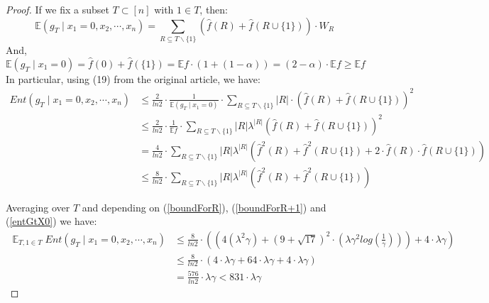 \documentclass{article}
\begin{document}
\begin{proof}
				If we fix a subset $T \subset [n]$ with $1 \in T$, then:
				\begin{equation} \label{g_T with x1=0}
					\mathbb{E} \left( g_T \mid x_1 = 0,x_2, \cdots, x_n \right) = \sum_{R \subseteq T \backslash \{1\}} \left( \hat{f}(R) + \hat{f}(R \cup \{1\}) \right) \cdot W_R
				\end{equation}
				And,
				\begin{equation}
					\mathbb{E} \left( g_T \mid x_1=0 \right) = \hat{f}(0) + \hat{f}(\{1\}) = \mathbb{E} f \cdot \left( 1 + (1-\alpha) \right) = (2-\alpha) \cdot \mathbb{E} f \geq \mathbb{E} f 
				\end{equation}
				In particular, using (19) from the original article, we have:				
				\begin{equation} \label{entGtX0} \begin{aligned}
					Ent \left( g_T \mid x_1 = 0,x_2, \cdots, x_n \right) 
					& \leq \frac{2}{ln 2} \cdot \frac{1}{\mathbb{E} \left( g_T \mid x_1=0 \right)} \cdot \sum_{R \subseteq {T\backslash \{1\}}} |R| \cdot \left( \hat{f} (R) + \hat{f} (R \cup \{1\}) \right)^2 \\ 
					& \leq \frac{2}{ln 2} \cdot \frac{1}{\mathbb{E} f} \cdot \sum_{R \subseteq {T\backslash \{1\}}} |R| \lambda^{|R|} \left( \hat{f} (R) + \hat{f} (R \cup \{1\}) \right)^2 \\ 
					& = \frac{4}{ln 2} \cdot \sum_{R \subseteq {T\backslash \{1\}}} |R| \lambda^{|R|} \left( \hat{f}^2 (R) + \hat{f}^2 (R \cup \{1\}) + 2 \cdot \hat{f}(R)  \cdot \hat{f} (R \cup \{1\}) \right) \\ 
					& \leq \frac{8}{ln 2} \cdot \sum_{R \subseteq {T\backslash \{1\}}} |R| \lambda^{|R|}  \left( \hat{f}^2 (R) + \hat{f}^2 (R \cup \{1\}) \right)
				\end{aligned}
				\end{equation}
				
				Averaging over $T$ and depending on (\ref{boundForR}), (\ref{boundForR+1}) and (\ref{entGtX0}) we have:
				\begin{equation} \label{final22} \begin{aligned}
					\mathop{\mathbb{E}}_{T, 1 \in T} Ent \left( g_T \mid x_1 = 0,x_2, \cdots, x_n \right)
					& \leq \frac{8}{ln 2} \cdot \left( \left( 4 ( \lambda^2 \gamma ) + \left( 9 + \sqrt{17} \right)^2 \cdot \left( \lambda \gamma^2 log \left( \frac{1}{\gamma} \right) \right) \right)  + 4 \cdot \lambda \gamma \right) \\
					& \leq \frac{8}{ln 2} \cdot \left( 4 \cdot \lambda \gamma + 64 \cdot \lambda \gamma + 4 \cdot \lambda \gamma \right) \\
					& = \frac{576}{ln 2} \cdot \lambda \gamma < 831 \cdot \lambda \gamma
				\end{aligned}			
				\end{equation}
			\end{proof}
			
\end{document}
